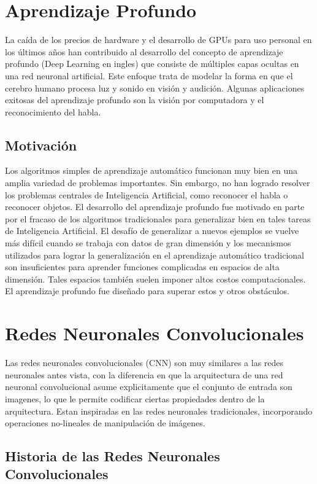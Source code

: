 \documentclass[a4paper,11pt,spanish]{book}
\begin{document}
  \section {Aprendizaje Profundo}
    La caída de los precios de hardware y el desarrollo de GPUs para uso personal en los últimos años han contribuido al desarrollo del concepto de aprendizaje profundo (Deep Learning en ingles)
    que consiste de múltiples capas ocultas en una red neuronal artificial. Este enfoque trata de modelar la forma en que el cerebro humano procesa luz y sonido en visión y audición.
    Algunas aplicaciones exitosas del aprendizaje profundo son la visión por computadora y el reconocimiento del habla.
    \subsection {Motivación}
      Los algoritmos simples de aprendizaje automático funcionan muy bien en una amplia variedad de problemas importantes. 
      Sin embargo, no han logrado resolver los problemas centrales de Inteligencia Artificial, como reconocer el habla o reconocer objetos. 
      El desarrollo del aprendizaje profundo fue motivado en parte por el fracaso de los algoritmos tradicionales para generalizar bien en tales tareas de Inteligencia Artificial.
      El desafío de generalizar a nuevos ejemplos se vuelve más difícil cuando se trabaja con datos de gran dimensión y los mecanismos utilizados para lograr la generalización 
      en el aprendizaje  automático tradicional son insuficientes para aprender funciones complicadas en espacios de alta dimensión. 
      Tales espacios también suelen imponer altos costos computacionales. El aprendizaje profundo fue diseñado para superar estos y otros obstáculos.

  \section {Redes Neuronales Convolucionales}
    Las redes neuronales convolucionales (CNN) son muy similares a las redes neuronales antes vista, con la diferencia en que la arquitectura de una red neuronal convolucional asume explicitamente
    que el conjunto de entrada son imagenes, lo que le permite codificar ciertas propiedades dentro de la arquitectura. 
    Estan inspiradas en las redes neuronales tradicionales, incorporando operaciones no-lineales de manipulación de imágenes.

    \subsection {Historia de las Redes Neuronales Convolucionales}
\end{document}
